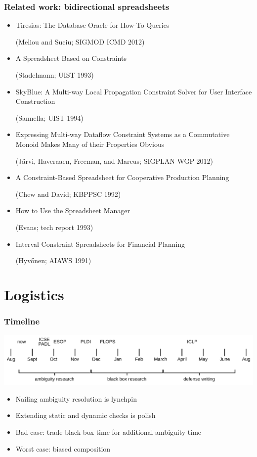 \documentclass[14pt]{beamer}
\begin{document}
\begin{frame}
    \frametitle{Related work: bidirectional spreadsheets}
    \begin{itemize}
        \footnotesize
        \item Tiresias: The Database Oracle for How-To Queries

            \quad (Meliou and Suciu; SIGMOD ICMD 2012)
        \item A Spreadsheet Based on Constraints

            \quad (Stadelmann; UIST 1993)
        \item SkyBlue: A Multi-way Local Propagation Constraint Solver for
            User Interface Construction

            \quad (Sannella; UIST 1994)
        \item Expressing Multi-way Dataflow Constraint Systems as a
            Commutative Monoid Makes Many of their Properties Obvious

            \quad (J\" arvi, Haveraaen, Freeman, and Marcus; SIGPLAN WGP 2012)
        \item A Constraint-Based Spreadsheet for Cooperative Production
            Planning

            \quad (Chew and David; KBPPSC 1992)
        \item How to Use the Spreadsheet Manager

            \quad (Evans; tech report 1993)
        \item Interval Constraint Spreadsheets for Financial Planning

            \quad (Hyv\H onen; AIAWS 1991)
    \end{itemize}
\end{frame}

\nocollaborators
\section{Logistics}
\begin{frame}
    \frametitle{Timeline}
    \begin{center}
        \includegraphics[scale=0.45]{timeline.pdf}
    \end{center}
    \begin{itemize}
        \item Nailing ambiguity resolution is lynchpin
        \item Extending static and dynamic checks is polish
        \item Bad case: trade black box time for additional ambiguity time
        \item Worst case: biased composition
    \end{itemize}
\end{frame}
\end{document}
